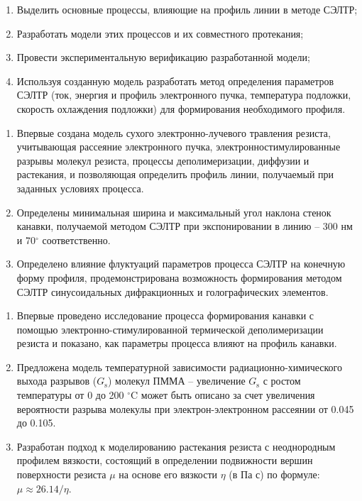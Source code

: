 \begin{enumerate}
	\item Выделить основные процессы, влияющие на профиль линии в методе СЭЛТР;
	\item Разработать модели этих процессов и их совместного протекания;
	\item Провести экспериментальную верификацию разработанной модели;
	\item Используя созданную модель разработать метод определения параметров СЭЛТР (ток, энергия и профиль электронного пучка, температура подложки, скорость охлаждения подложки) для формирования необходимого профиля.
\end{enumerate}



\begin{enumerate}
	\item Впервые создана модель сухого электронно-лучевого травления резиста, учитывающая рассеяние электронного пучка, электронностимулированные разрывы молекул резиста, процессы деполимеризации, диффузии и растекания, и позволяющая определить профиль линии, получаемый при заданных условиях процесса.
	\item Определены минимальная ширина и максимальный угол наклона стенок канавки, получаемой методом СЭЛТР при экспонировании в линию -- 300 нм и 70$^\circ$ соответственно.
	\item Определено влияние флуктуаций параметров процесса СЭЛТР на конечную форму профиля, продемонстрирована возможность формирования методом СЭЛТР синусоидальных дифракционных и голографических элементов.
\end{enumerate}


\novelty

\begin{enumerate}
	\item Впервые проведено исследование процесса формирования канавки с помощью электронно-стимулированной термической деполимеризации резиста и показано, как параметры процесса влияют на профиль канавки.
	\item Предложена модель температурной зависимости радиационно-химического выхода разрывов ($G_\mathrm{s}$) молекул ПММА -- увеличение $G_\mathrm{s}$ с ростом температуры от 0 до 200 $^\circ$C может быть описано за счет увеличения вероятности разрыва молекулы при электрон-электронном рассеянии от 0.045 до 0.105.
	\item Разработан подход к моделированию растекания резиста с неоднородным профилем вязкости, состоящий в определении подвижности вершин поверхности резиста $\mu$ на основе его вязкости $\eta$ (в Па с) по формуле: $\mu \approx 26.14 / \eta$.
\end{enumerate}


